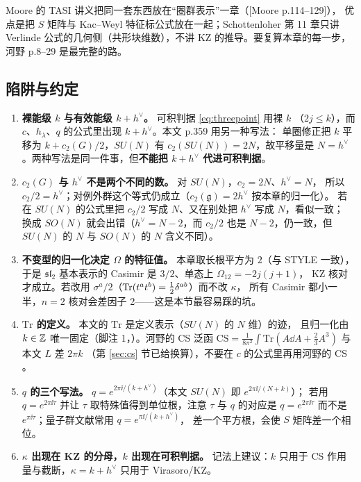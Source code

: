 Moore 的 TASI 讲义把同一套东西放在“圈群表示”一章（[Moore p.114--129]），
优点是把 $S$ 矩阵与 Kac--Weyl 特征标公式放在一起；Schottenloher 第 11 章只讲
Verlinde 公式的几何侧（共形块维数），不讲 KZ 的推导。要复算本章的每一步，
河野 p.8--29 是最完整的路。

\subsection{陷阱与约定}

\begin{enumerate}[leftmargin=2em]
\item \textbf{裸能级 $k$ 与有效能级 $k+h^\vee$。} 可积判据 \eqref{eq:threepoint} 用裸 $k$
（$2j\le k$），而 $c$、$h_\lambda$、$q$ 的公式里出现 $k+h^\vee$。本文 p.359 用另一种写法：
单圈修正把 $k$ 平移为 $k+c_2(G)/2$，$SU(N)$ 有 $c_2(SU(N))=2N$，故平移量是 $N=h^\vee$
。两种写法是同一件事，但\textbf{不能把 $k+h^\vee$ 代进可积判据}。
\item \textbf{$c_2(G)$ 与 $h^\vee$ 不是两个不同的数。} 对 $SU(N)$，$c_2=2N$、$h^\vee=N$，
所以 $c_2/2=h^\vee$；对例外群这个等式仍成立（$c_2(\mathfrak g)=2h^\vee$ 按本章的归一化）。
若在 $SU(N)$ 的公式里把 $c_2/2$ 写成 $N$、又在别处把 $h^\vee$ 写成 $N$，看似一致；
换成 $SO(N)$ 就会出错（$h^\vee=N-2$，而 $c_2/2$ 也是 $N-2$，仍一致，但 $SU(N)$ 的 $N$
与 $SO(N)$ 的 $N$ 含义不同）。
\item \textbf{不变型的归一化决定 $\Omega$ 的特征值。} 本章取长根平方为 $2$（与 STYLE 一致），
于是 $\mathfrak{sl}_2$ 基本表示的 Casimir 是 $3/2$、单态上 $\Omega_{12}=-2j(j+1)$，
KZ 核对才成立。若改用 $\sigma^a/2$（$\operatorname{Tr}(t^at^b)=\frac12\delta^{ab}$）而不改 $\kappa$，
所有 Casimir 都小一半，$n=2$ 核对会差因子 2——这是本节最容易踩的坑。
\item \textbf{$\mathrm{Tr}$ 的定义。} 本文的 $\mathrm{Tr}$ 是定义表示（$SU(N)$ 的 $N$ 维）的迹，
且归一化由 $k\in\mathbb{Z}$ 唯一固定（脚注 1，）。河野的 CS 泛函
$\mathrm{CS}=\frac{1}{8\pi^2}\int\mathrm{Tr}(A\dd A+\frac23A^3)$ 与本文 $L$ 差 $2\pi k$
（第 \ref{sec:cs} 节已给换算），不要在 $c$ 的公式里再用河野的 $\mathrm{CS}$。
\item \textbf{$q$ 的三个写法。} $q=e^{2\pi\ii/(k+h^\vee)}$（本文 $SU(N)$ 即 $e^{2\pi\ii/(N+k)}$）；
若用 $q=e^{2\pi\ii\tau}$ 并让 $\tau$ 取特殊值得到单位根，注意 $\tau$ 与 $q$ 的对应是
$q=e^{2\pi\ii\tau}$ 而不是 $e^{\pi\ii\tau}$；量子群文献常用 $q=e^{\pi\ii/(k+h^\vee)}$，
差一个平方根，会使 $S$ 矩阵差一个相位。
\item \textbf{$\kappa$ 出现在 KZ 的分母，$k$ 出现在可积判据。} 记法上建议：$k$ 只用于
CS 作用量与截断，$\kappa=k+h^\vee$ 只用于 Virasoro/KZ。
\end{enumerate}


